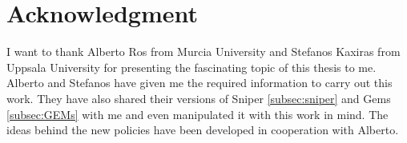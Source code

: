 \chapter*{Acknowledgment}
I want to thank Alberto Ros from Murcia University and Stefanos Kaxiras from
Uppsala University for presenting the fascinating topic of this thesis to me. Alberto
and Stefanos have given me the required information to carry out this work. They
have also shared their versions of Sniper \ref{subsec:sniper} and Gems \ref{subsec:GEMs}  with me and even
manipulated it with this work in mind. The ideas behind the new policies have been developed in cooperation with Alberto.
\newpage